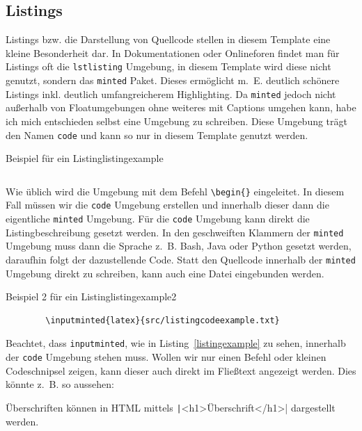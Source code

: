 \subsection{Listings}\label{listings}

Listings bzw. die Darstellung von Quellcode stellen in diesem Template eine
kleine Besonderheit dar. In Dokumentationen oder Onlineforen findet man für
Listings oft die \texttt{lstlisting} Umgebung, in diesem
Template wird diese nicht genutzt, sondern das \texttt{minted} Paket.
Dieses ermöglicht m. E. deutlich schönere Listings inkl. deutlich
umfangreicherem Highlighting. Da \texttt{minted} jedoch nicht außerhalb von
Floatumgebungen ohne weiteres mit
Captions umgehen kann, habe ich mich entschieden selbst eine Umgebung zu
schreiben. Diese Umgebung trägt den Namen \texttt{code} und kann so nur in
diesem Template genutzt werden.

\begin{code}{Beispiel für ein Listing}{listingexample}
	\inputminted{latex}{src/listingcodeexample.txt}
\end{code}

Wie üblich wird die Umgebung mit dem Befehl \texttt{\textbackslash begin\{\}}
eingeleitet. In diesem Fall müssen wir die \texttt{code} Umgebung erstellen und
innerhalb dieser dann die eigentliche \texttt{minted} Umgebung. Für die
\texttt{code} Umgebung kann direkt die Listingbeschreibung gesetzt werden. In
den geschweiften Klammern der \texttt{minted} Umgebung muss dann die Sprache
z. B. Bash, Java oder Python gesetzt werden, daraufhin folgt der dazustellende
Code. Statt den Quellcode innerhalb der \texttt{minted} Umgebung direkt zu
schreiben, kann auch eine Datei eingebunden werden.

\begin{code}{Beispiel 2 für ein Listing}{listingexample2}
	\begin{verbatim}
		\inputminted{latex}{src/listingcodeexample.txt}	
	\end{verbatim}
\end{code}

Beachtet, dass \texttt{inputminted}, wie in Listing~\ref{listingexample} zu
sehen, innerhalb der \texttt{code} Umgebung stehen muss. Wollen wir nur einen
Befehl oder kleinen Codeschnipsel zeigen, kann dieser auch direkt im Fließtext
angezeigt werden. Dies könnte z. B. so aussehen:

Überschriften können in HTML mittels \texttt|<h1>Überschrift</h1>|
dargestellt werden.

